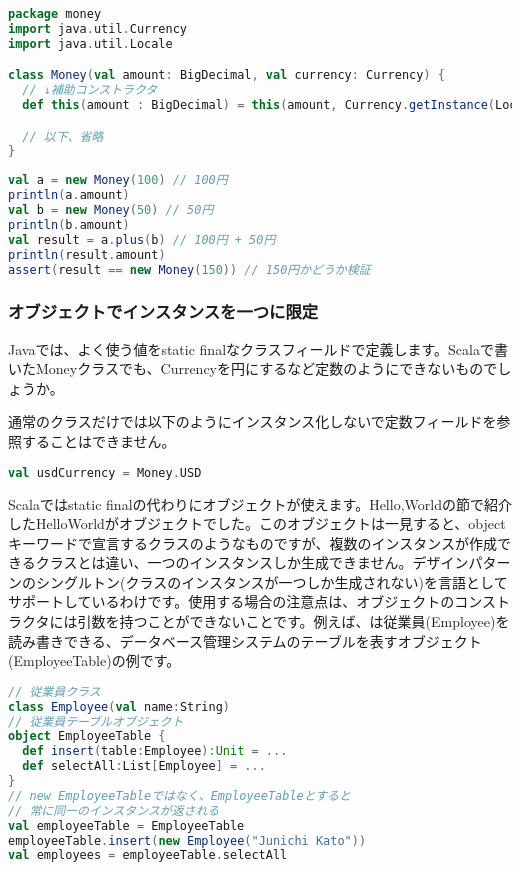 \begin{lstlisting}[language=scala, label=src:aux_const, caption=補助コンストラクタの例]
package money
import java.util.Currency
import java.util.Locale

class Money(val amount: BigDecimal, val currency: Currency) {
  // ↓補助コンストラクタ
  def this(amount : BigDecimal) = this(amount, Currency.getInstance(Locale.getDefault))

  // 以下、省略
}
\end{lstlisting}

\begin{lstlisting}[language=scala, label=src:aux_const_test, caption=\lstRef{src:aux_const}用のテストコード]
val a = new Money(100) // 100円
println(a.amount)
val b = new Money(50) // 50円
println(b.amount)
val result = a.plus(b) // 100円 + 50円
println(result.amount)
assert(result == new Money(150)) // 150円かどうか検証
\end{lstlisting}

\subsubsection{オブジェクトでインスタンスを一つに限定}
Javaでは、よく使う値をstatic finalなクラスフィールドで定義します。Scalaで書いたMoneyクラスでも、Currencyを円にするなど定数のようにできないものでしょうか。

通常のクラスだけでは以下のようにインスタンス化しないで定数フィールドを参照することはできません。
\begin{lstlisting}[language=scala, frame=none]
val usdCurrency = Money.USD
\end{lstlisting}

Scalaではstatic finalの代わりにオブジェクトが使えます。Hello,Worldの節で紹介したHelloWorldがオブジェクトでした。このオブジェクトは一見すると、objectキーワードで宣言するクラスのようなものですが、複数のインスタンスが作成できるクラスとは違い、一つのインスタンスしか生成できません。デザインパターンのシングルトン(クラスのインスタンスが一つしか生成されない)を言語としてサポートしているわけです。使用する場合の注意点は、オブジェクトのコンストラクタには引数を持つことができないことです。例えば、は従業員(Employee)を読み書きできる、データベース管理システムのテーブルを表すオブジェクト(EmployeeTable)の例です。

\begin{lstlisting}[language=scala, label=src:dao_object, caption=データベース管理システムのテーブルを表すオブジェクトの例]
// 従業員クラス
class Employee(val name:String)
// 従業員テーブルオブジェクト
object EmployeeTable {
  def insert(table:Employee):Unit = ...
  def selectAll:List[Employee] = ...
}
// new EmployeeTableではなく、EmployeeTableとすると
// 常に同一のインスタンスが返される
val employeeTable = EmployeeTable
employeeTable.insert(new Employee("Junichi Kato"))
val employees = employeeTable.selectAll
\end{lstlisting}

